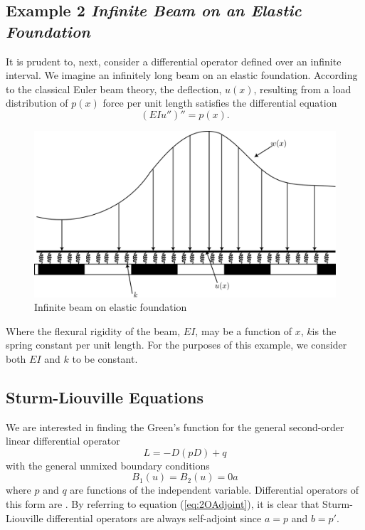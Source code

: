 \subsection{Example 2 \textit{Infinite Beam on an Elastic Foundation}}
    It is prudent to, next, consider a differential operator defined over an infinite interval. We imagine an infinitely long beam on an elastic foundation. According to the classical Euler beam theory, the deflection, \(u(x)\), resulting from a load distribution of \(p(x)\) force per unit length satisfies the differential equation
    \begin{equation}
        (EIu'')'' = p(x).
    \end{equation}
    \begin{figure}
        \centering
        \includegraphics[width=0.75\linewidth]{include/Beam.png}
        \caption{Infinite beam on elastic foundation}
    \end{figure}

    Where the flexural rigidity of the beam, \(EI\), may be a function of \(x\), \(k\)is the spring constant per unit length. For the purposes of this example, we consider both \(EI\) and \(k\) to be constant.

\subsection{Sturm-Liouville Equations}
    We are interested in finding the Green's function for the general second-order linear differential operator
    \begin{equation}
        L = -D(pD)+q
    \end{equation}
    with the general unmixed boundary conditions
    \begin{equation}
        B_1(u)=B_2(u)=0a
    \end{equation}
    where \(p\) and \(q\) are functions of the independent variable. Differential operators of this form are . By referring to equation (\ref{eq:2OAdjoint}), it is clear that Sturm-Liouville differential operators are always self-adjoint since \(a=p\) and \(b=p'\). 

